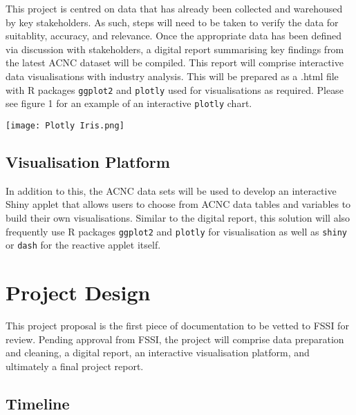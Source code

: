 \documentclass[11pt,]{article}
\let\origfigure\figure
\let\endorigfigure\endfigure
\renewenvironment{figure}[1][2] {
    \expandafter\origfigure\expandafter[H]
} {
    \endorigfigure
}
\begin{document}
This project is centred on data that has already been collected and
warehoused by key stakeholders. As such, steps will need to be taken to
verify the data for suitablity, accuracy, and relevance. Once the
appropriate data has been defined via discussion with stakeholders, a
digital report summarising key findings from the latest ACNC dataset
will be compiled. This report will comprise interactive data
visualisations with industry analysis. This will be prepared as a .html
file with R packages \texttt{ggplot2} and \texttt{plotly} used for
visualisations as required. Please see figure 1 for an example of an
interactive \texttt{plotly} chart.

\begin{figure}
\centering
\texttt{[image: Plotly Iris.png]}
\caption{A \texttt{Plotly} interactive plot using the Iris dataset}
\end{figure}

\subsection{Visualisation Platform}\label{visualisation-platform}

In addition to this, the ACNC data sets will be used to develop an
interactive Shiny applet that allows users to choose from ACNC data
tables and variables to build their own visualisations. Similar to the
digital report, this solution will also frequently use R packages
\texttt{ggplot2} and \texttt{plotly} for visualisation as well as
\texttt{shiny} or \texttt{dash} for the reactive applet itself.

\section{Project Design}\label{project-design}

This project proposal is the first piece of documentation to be vetted
to FSSI for review. Pending approval from FSSI, the project will
comprise data preparation and cleaning, a digital report, an interactive
visualisation platform, and ultimately a final project report.


\subsection{Timeline}\label{timeline}
\end{document}

